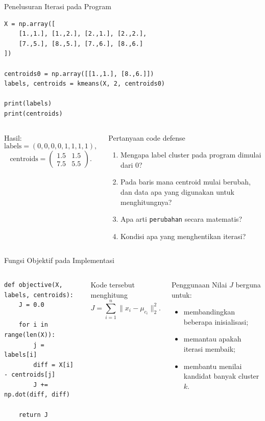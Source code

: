 \documentclass[aspectratio=169,11pt]{beamer}
\begin{document}
\begin{frame}[fragile]{Penelusuran Iterasi pada Program}
\begin{lstlisting}[basicstyle=\ttfamily\tiny]
X = np.array([
    [1.,1.], [1.,2.], [2.,1.], [2.,2.],
    [7.,5.], [8.,5.], [7.,6.], [8.,6.]
])

centroids0 = np.array([[1.,1.], [8.,6.]])
labels, centroids = kmeans(X, 2, centroids0)

print(labels)
print(centroids)
\end{lstlisting}

\begin{columns}[T]
\footnotesize
Hasil:
\[
\text{labels}=(0,0,0,0,1,1,1,1),
\]
\[
\text{centroids}=
\begin{pmatrix}
1.5&1.5\\
7.5&5.5
\end{pmatrix}.
\]
\begin{alertblock}{Pertanyaan code defense}
\footnotesize
\begin{enumerate}
\item Mengapa label cluster pada program dimulai dari 0?
\item Pada baris mana centroid mulai berubah, dan data apa yang digunakan untuk menghitungnya?
\item Apa arti \texttt{perubahan} secara matematis?
\item Kondisi apa yang menghentikan iterasi?
\end{enumerate}
\end{alertblock}
\end{columns}
\end{frame}

\begin{frame}[fragile]{Fungsi Objektif pada Implementasi}
\begin{columns}[T]
\begin{lstlisting}
def objective(X, labels, centroids):
    J = 0.0

    for i in range(len(X)):
        j = labels[i]
        diff = X[i] - centroids[j]
        J += np.dot(diff, diff)

    return J
\end{lstlisting}

\small
Kode tersebut menghitung
\[
J
=
\sum_{i=1}^{n}
\|x_i-\mu_{c_i}\|_2^2.
\]

\begin{block}{Penggunaan}
\footnotesize
Nilai $J$ berguna untuk:
\begin{itemize}
\item membandingkan beberapa inisialisasi;
\item memantau apakah iterasi membaik;
\item membantu menilai kandidat banyak cluster $k$.
\end{itemize}
\end{block}
\end{columns}
\end{frame}
\end{document}
